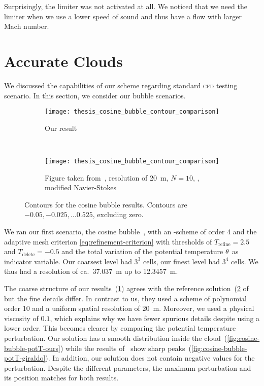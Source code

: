 Surprisingly, the limiter was not activated at all.
We noticed that we need the limiter when we use a lower speed of sound and thus have a flow with larger Mach number.

\section{Accurate Clouds}\label{sec:results-cloud}
We discussed the capabilities of our scheme regarding standard \textsc{cfd} testing scenario.
In this section, we consider our bubble scenarios.
\begin{figure}[htb]
  \centering
  \begin{subfigure}[t]{0.5\textwidth}
    \centering
    \texttt{[image: thesis\_cosine\_bubble\_contour\_comparison]}
    \caption{\label{fig:cosine-bubble-contour-ours}%
      Our result}
  \end{subfigure}~%
  \begin{subfigure}[t]{0.5\textwidth}
    \centering
    \texttt{[image: thesis\_cosine\_bubble\_contour\_comparison]}
    \caption{\label{fig:cosine-bubble-contour-giraldo}%
      Figure taken from~\cite{giraldo2008study}, resolution of \SI{20}{\m}, $N = 10$, \dg{}, modified Navier-Stokes} %
  \end{subfigure}
  \caption{\label{fig:cosine-bubble-contour}%
    Contours for the cosine bubble results.
    Contours are $-0.05, -0.025, \ldots 0.525$, excluding zero.
  }
\end{figure}
We ran our first scenario, the cosine bubble~, with an \aderdg{}-scheme of order 4 and the adaptive mesh criterion \cref{eq:refinement-criterion} with thresholds of $T_\text{refine} = 2.5$ and $T_\text{delete} = -0.5$ and the total variation of the potential temperature $\theta$ as indicator variable.
Our coarsest level had $3^3$ cells, our finest level had $3^4$ cells.
We thus had a resolution of ca.\ \SI{37.037}{\m} up to \SI{12.3457}{\m}.

The coarse structure of our results~(\cref{fig:cosine-bubble-contour-ours}) agrees with the reference solution~(\cref{fig:cosine-bubble-contour-giraldo} of~\cite{giraldo2008study} but the fine details differ.
In contrast to us, they used a scheme of polynomial order 10 and a uniform spatial resolution of \SI{20}{\m}.
Moreover, we used a physical viscosity of $0.1$, which explains why we have fewer spurious details despite using a lower order.
This becomes clearer by comparing the potential temperature perturbation.
Our solution has a smooth distribution inside the cloud~(\cref{fig:cosine-bubble-potT-ours}) while the results of~\cite{giraldo2008study} show sharp peaks~(\cref{fig:cosine-bubble-potT-giraldo}).
In addition, our solution does not contain negative values for the perturbation.
Despite the different parameters, the maximum perturbation and its position matches for both results.


